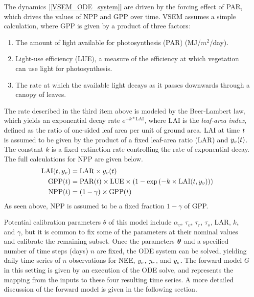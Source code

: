 \documentclass[12pt]{article}
\begin{document}
The dynamics [\ref{VSEM_ODE_system}] are driven by the forcing effect of PAR, which drives the values of NPP and GPP over time. VSEM assumes a simple calculation, 
where GPP is given by a product of three factors:
\begin{enumerate}
\item The amount of light available for photosynthesis (PAR) (MJ/$m^2$/day).
\item Light-use efficiency (LUE), a measure of the efficiency at which vegetation can use light for photosynthesis. 
\item The rate at which the available light decays as it passes downwards through a canopy of leaves. 
\end{enumerate}
The rate described in the third item above is modeled by the Beer-Lambert law, which yields an exponential decay rate $e^{-k*\text{LAI}}$, 
where LAI is the \textit{leaf-area index}, defined as the ratio of one-sided leaf area per unit of ground area. LAI at time $t$ is assumed to be given by the product of a fixed 
leaf-area ratio (LAR) and $y_v(t)$. The constant $k$ is a fixed extinction rate controlling the rate of exponential decay. The full calculations for NPP are given below. 
\begin{align}
\text{LAI}(t, y_v) &= \text{LAR} \times y_v(t) \\
\text{GPP}(t) &= \text{PAR}(t) \times \text{LUE} \times \left(1 -  \exp\left(-k \times \text{LAI}(t, y_v) \right) \right) \nonumber \\
\text{NPP}(t) &= (1 - \gamma) \times \text{GPP}(t) \nonumber
\end{align}
As seen above, NPP is assumed to be a fixed fraction $1 - \gamma$ of GPP.

Potential calibration parameters $\theta$ of this model include $\alpha_v$, $\tau_v$, $\tau_r$, $\tau_s$, $\text{LAR}$, $k$, and $\gamma$, but it is common to fix some of the parameters at their 
nominal values and calibrate the remaining subset. 
Once the parameters $\boldsymbol{\theta}$ and a specified number of time steps (days) $n$ are fixed, the ODE system can be solved, yielding daily time series of $n$
observations for NEE, $y_v$, $y_r$, and $y_s$. The forward model $G$ in this setting is given by an execution of the ODE solve, and represents
the mapping from the inputs to these four resulting time series. A more detailed discussion of the forward model is given in the following section. 
\end{document}
